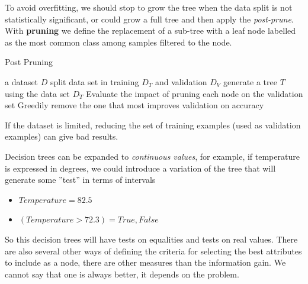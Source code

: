 \documentclass[10pt, letterpaper]{report}
\begin{document}
To avoid overfitting, we should stop to grow the tree when the data split is not statistically significant, or could grow a full tree and then apply the \textit{post-prune}. With \textbf{pruning} we define the replacement of a sub-tree with a leaf node labelled as the most common class among samples filtered to the node.\bigskip

\begin{algorithm}
	\caption{Post Pruning}\label{alg:pruning}
	\begin{algorithmic}
		\Require a dataset $D$
		\State split data set in training $D_T$ and validation $D_V$
		\State generate a tree $T$ using the data set $D_T$
		\State  Evaluate the impact of pruning each node on the validation set
		\State Greedily remove the one that most improves validation on accuracy
		\EndWhile
	\end{algorithmic}
\end{algorithm}

If the dataset is limited, reducing the set of training examples (used
as validation examples) can give bad results.\bigskip

Decision trees can be expanded to \textit{continuous values}, for example, if temperature is expressed in degrees, we could introduce a variation of the tree that will generate some ''test'' in terms of intervals\begin{itemize}
	\item $Temperature=82.5$
	\item $(Temperature > 72.3) = True,False$
\end{itemize}
So this decision trees will have tests on equalities and tests on real values. There are also several other ways of defining the criteria for selecting the best attributes to include as a node, there are other measures than the information gain. We cannot say that one is always better, it depends on the problem.\bigskip
\end{document}
